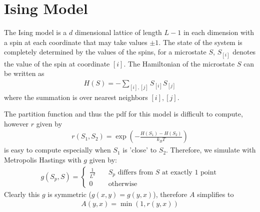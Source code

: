 \documentclass{article}
\begin{document}
\section{Ising Model}

The Ising model is a $d$ dimensional lattice of length $L - 1$ in each dimension with a spin at each coordinate that may take values $\pm 1$.
The state of the system is completely determined by the values of the spins,
for a microstate $S$, $S_{[i]}$ denotes the value of the spin at coordinate $[i]$.
The Hamiltonian of the microstate $S$ can be written as
\begin{align*}
    H(S) = - \sum_{[i],[j]} S_{[i]} S_{[j]}
\end{align*}
where the summation is over nearest neighbors $[i], [j]$.

The partition function and thus the pdf for this model is difficult to compute, however $r$ given by
\begin{align*}
    r(S_1, S_2) = \exp\left(-\frac{H(S_1) - H(S_2)}{k_B T}\right)
\end{align*}
is easy to compute especially when $S_1$ is 'close' to $S_2$.
Therefore, we simulate with Metropolis Hastings with $g$ given by:
\begin{align*}
    g(S_p, S) = \begin{cases}
        \frac{1}{L^d}\quad &\text{$S_p$ differs from $S$ at exactly $1$ point} \\
        0 &\text{otherwise}
    \end{cases}
\end{align*}
Clearly this $g$ is symmetric ($g(x, y) = g(y, x)$), therefore $A$ simplifies to
\begin{align*}
    A(y, x) = \min(1, r(y, x))
\end{align*}
\end{document}
